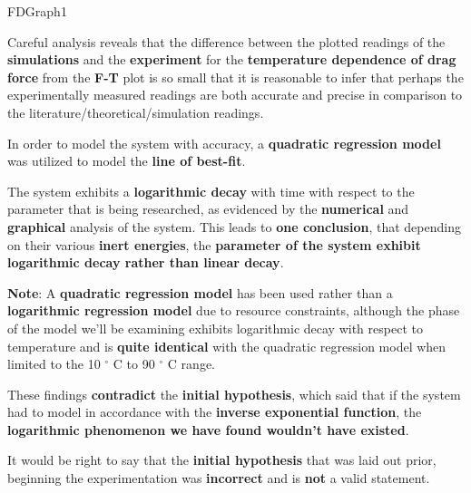 
{FDGraph1}            
            
{Careful analysis reveals that the difference between the plotted readings of the \textbf{simulations} and the \textbf{experiment} for the \textbf{temperature dependence of drag force} from the \textbf{F-T} plot is so small that it is reasonable to infer that perhaps the experimentally measured readings are both accurate and precise in comparison to the literature/theoretical/simulation readings.}

{In order to model the system with accuracy, a \textbf{quadratic regression model} was utilized to model the \textbf{line of best-fit}.}
        
{The system exhibits a \textbf{logarithmic decay} with time with respect to the parameter that is being researched, as evidenced by the \textbf{numerical} and \textbf{graphical} analysis of the system. This leads to \textbf{one conclusion}, that depending on their various \textbf{inert energies}, the \textbf{parameter of the system exhibit logarithmic decay rather than linear decay}.}

{\textbf{Note}: A \textbf{quadratic regression model} has been used rather than a \textbf{logarithmic regression model} due to resource constraints, although the phase of the model we'll be examining exhibits logarithmic decay with respect to temperature and is \textbf{quite identical} with the quadratic regression model when limited to the 10 $^\circ$ C to 90 $^\circ$ C range.}
	 
{These findings \textbf{contradict} the \textbf{initial hypothesis}, which said that if the system had to model in accordance with the \textbf{inverse exponential function}, the \textbf{logarithmic phenomenon we have found wouldn't have existed}.}        
        

{It would be right to say that the \textbf{initial hypothesis} that was laid out prior, beginning the experimentation was \textbf{incorrect} and is \textbf{not} a valid statement.}        
    
    

